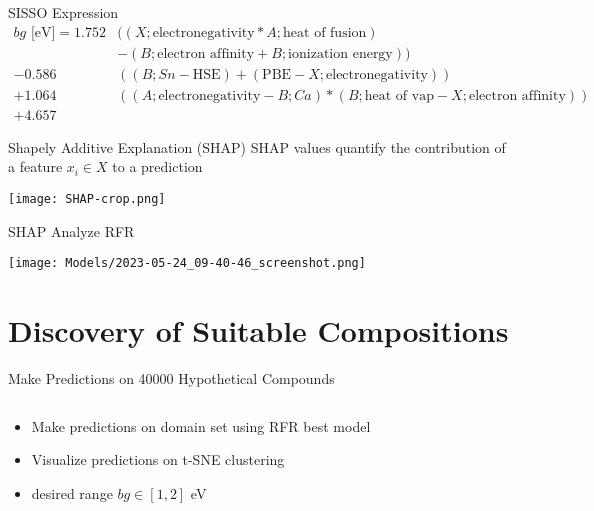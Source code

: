 \documentclass[10pt, aspectratio=169, presentation]{beamer}
\begin{document}
\begin{frame}[label={sec:org84588af}]{SISSO Expression}
\begin{align*}
bg\mbox{ [eV]} = 1.752 &((X;\mbox{electronegativity}*A;\mbox{heat of fusion})\\
                       &-(B;\mbox{electron affinity}+B;\mbox{ionization energy}))\\
                -0.586 &((B;Sn-\mbox{HSE})+(\mbox{PBE}-X;\mbox{electronegativity}))\\
                +1.064 &((A;\mbox{electronegativity}-B;Ca)*(B;\mbox{heat of vap}-X;\mbox{electron affinity}))\\
                +4.657
\end{align*}
\end{frame}

\begin{frame}[label={sec:orgc301ee3}]{Shapely Additive Explanation (SHAP)}
SHAP values quantify the contribution of a feature \(x_i \in X\) to a prediction
\autocite{lundberg-2017-unified-approac}

\begin{center}
\texttt{[image: SHAP-crop.png]}
\end{center}
\end{frame}

\begin{frame}[label={sec:org9fce750}]{SHAP Analyze RFR}
\begin{center}
\texttt{[image: Models/2023-05-24\_09-40-46\_screenshot.png]}
\end{center}
\end{frame}

\section{Discovery of Suitable Compositions}
\label{sec:org9d17fc3}
\begin{frame}[label={sec:org57313ed}]{Make Predictions on \alert{40000} Hypothetical Compounds}
\begin{columns}
\begin{column}{0.4\columnwidth}
\begin{itemize}
\item Make predictions on domain set using RFR best model
\item Visualize predictions on t-SNE clustering
\item desired range \(bg \in [1, 2]\) eV
\end{itemize}
\end{column}

\begin{column}{0.6\columnwidth}
 
\begin{center}

\end{center}
\end{column}
\end{columns}
\end{frame}
\end{document}
